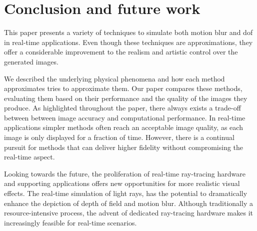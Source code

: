 \chapter{Conclusion and future work}
This paper presents a variety of techniques to simulate both motion blur and \gls{dof} in real-time applications.
Even though these techniques are approximations, they offer a considerable improvement to the realism and artistic control over the generated images.

We described the underlying physical phenomena and how each method approximates tries to approximate them.
Our paper compares these methods, evaluating them based on their performance and the quality of the images they produce.
As highlighted throughout the paper, there always exists a trade-off between between image accuracy and computational performance.
In real-time applications simpler methods often reach an acceptable image quality, as each image is only displayed for a fraction of time.
However, there is a continual pursuit for methods that can deliver higher fidelity without compromising the real-time aspect.

Looking towards the future, the proliferation of real-time ray-tracing hardware and supporting applications offers new opportunities for more realistic visual effects.
The real-time simulation of light rays, has the potential to dramatically enhance the depiction of depth of field and motion blur.
Although traditionally a resource-intensive process, the advent of dedicated ray-tracing hardware makes it increasingly feasible for real-time scenarios.
